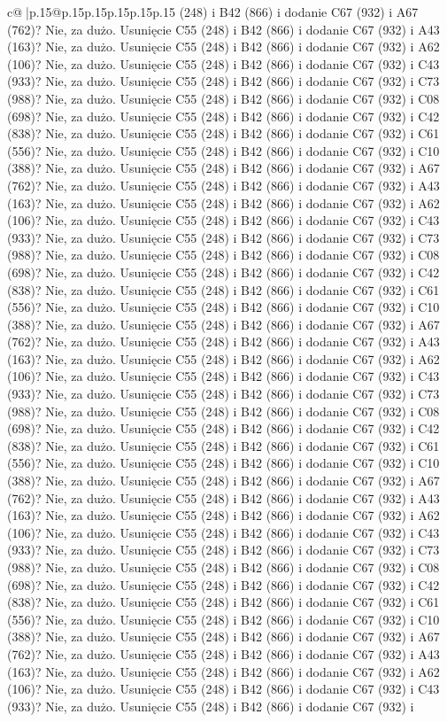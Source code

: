 \documentclass{article}
\begin{document}
{\begin{supertabular}{c@{$\;$}|p{.15\linewidth}@{}p{.15\linewidth}p{.15\linewidth}p{.15\linewidth}p{.15\linewidth}p{.15\linewidth}}
{{{(248) i B42 (866) i dodanie C67 (932) i A67 (762)? Nie, za dużo. Usunięcie C55 (248) i B42 (866) i dodanie C67 (932) i A43 (163)? Nie, za dużo. Usunięcie C55 (248) i B42 (866) i dodanie C67 (932) i A62 (106)? Nie, za dużo. Usunięcie C55 (248) i B42 (866) i dodanie C67 (932) i C43 (933)? Nie, za dużo. Usunięcie C55 (248) i B42 (866) i dodanie C67 (932) i C73 (988)? Nie, za dużo. Usunięcie C55 (248) i B42 (866) i dodanie C67 (932) i C08 (698)? Nie, za dużo. Usunięcie C55 (248) i B42 (866) i dodanie C67 (932) i C42 (838)? Nie, za dużo. Usunięcie C55 (248) i B42 (866) i dodanie C67 (932) i C61 (556)? Nie, za dużo. Usunięcie C55 (248) i B42 (866) i dodanie C67 (932) i C10 (388)? Nie, za dużo. Usunięcie C55 (248) i B42 (866) i dodanie C67 (932) i A67 (762)? Nie, za dużo. Usunięcie C55 (248) i B42 (866) i dodanie C67 (932) i A43 (163)? Nie, za dużo. Usunięcie C55 (248) i B42 (866) i dodanie C67 (932) i A62 (106)? Nie, za dużo. Usunięcie C55 (248) i B42 (866) i dodanie C67 (932) i C43 (933)? Nie, za dużo. Usunięcie C55 (248) i B42 (866) i dodanie C67 (932) i C73 (988)? Nie, za dużo. Usunięcie C55 (248) i B42 (866) i dodanie C67 (932) i C08 (698)? Nie, za dużo. Usunięcie C55 (248) i B42 (866) i dodanie C67 (932) i C42 (838)? Nie, za dużo. Usunięcie C55 (248) i B42 (866) i dodanie C67 (932) i C61 (556)? Nie, za dużo. Usunięcie C55 (248) i B42 (866) i dodanie C67 (932) i C10 (388)? Nie, za dużo. Usunięcie C55 (248) i B42 (866) i dodanie C67 (932) i A67 (762)? Nie, za dużo. Usunięcie C55 (248) i B42 (866) i dodanie C67 (932) i A43 (163)? Nie, za dużo. Usunięcie C55 (248) i B42 (866) i dodanie C67 (932) i A62 (106)? Nie, za dużo. Usunięcie C55 (248) i B42 (866) i dodanie C67 (932) i C43 (933)? Nie, za dużo. Usunięcie C55 (248) i B42 (866) i dodanie C67 (932) i C73 (988)? Nie, za dużo. Usunięcie C55 (248) i B42 (866) i dodanie C67 (932) i C08 (698)? Nie, za dużo. Usunięcie C55 (248) i B42 (866) i dodanie C67 (932) i C42 (838)? Nie, za dużo. Usunięcie C55 (248) i B42 (866) i dodanie C67 (932) i C61 (556)? Nie, za dużo. Usunięcie C55 (248) i B42 (866) i dodanie C67 (932) i C10 (388)? Nie, za dużo. Usunięcie C55 (248) i B42 (866) i dodanie C67 (932) i A67 (762)? Nie, za dużo. Usunięcie C55 (248) i B42 (866) i dodanie C67 (932) i A43 (163)? Nie, za dużo. Usunięcie C55 (248) i B42 (866) i dodanie C67 (932) i A62 (106)? Nie, za dużo. Usunięcie C55 (248) i B42 (866) i dodanie C67 (932) i C43 (933)? Nie, za dużo. Usunięcie C55 (248) i B42 (866) i dodanie C67 (932) i C73 (988)? Nie, za dużo. Usunięcie C55 (248) i B42 (866) i dodanie C67 (932) i C08 (698)? Nie, za dużo. Usunięcie C55 (248) i B42 (866) i dodanie C67 (932) i C42 (838)? Nie, za dużo. Usunięcie C55 (248) i B42 (866) i dodanie C67 (932) i C61 (556)? Nie, za dużo. Usunięcie C55 (248) i B42 (866) i dodanie C67 (932) i C10 (388)? Nie, za dużo. Usunięcie C55 (248) i B42 (866) i dodanie C67 (932) i A67 (762)? Nie, za dużo. Usunięcie C55 (248) i B42 (866) i dodanie C67 (932) i A43 (163)? Nie, za dużo. Usunięcie C55 (248) i B42 (866) i dodanie C67 (932) i A62 (106)? Nie, za dużo. Usunięcie C55 (248) i B42 (866) i dodanie C67 (932) i C43 (933)? Nie, za dużo. Usunięcie C55 (248) i B42 (866) i dodanie C67 (932) i }}}
\end{supertabular}}
\end{document}
